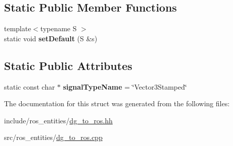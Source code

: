 \subsection*{Static Public Member Functions}
\begin{DoxyCompactItemize}
\item 
{\footnotesize template$<$typename S $>$ }\\static void {\bfseries set\+Default} (S \&s)\hypertarget{structdynamic__graph_1_1DgToRos_3_01std_1_1pair_3_01specific_1_1Vector3_00_01Vector_01_4_01_4_a85e4b5b1a35534adb8584c723bf93a7c}{}\label{structdynamic__graph_1_1DgToRos_3_01std_1_1pair_3_01specific_1_1Vector3_00_01Vector_01_4_01_4_a85e4b5b1a35534adb8584c723bf93a7c}

\end{DoxyCompactItemize}
\subsection*{Static Public Attributes}
\begin{DoxyCompactItemize}
\item 
static const char $\ast$ {\bfseries signal\+Type\+Name} = \char`\"{}Vector3\+Stamped\char`\"{}\hypertarget{structdynamic__graph_1_1DgToRos_3_01std_1_1pair_3_01specific_1_1Vector3_00_01Vector_01_4_01_4_a39142c1dac9d7e9aab9230dce9a6fd79}{}\label{structdynamic__graph_1_1DgToRos_3_01std_1_1pair_3_01specific_1_1Vector3_00_01Vector_01_4_01_4_a39142c1dac9d7e9aab9230dce9a6fd79}

\end{DoxyCompactItemize}


The documentation for this struct was generated from the following files\+:\begin{DoxyCompactItemize}
\item 
include/ros\+\_\+entities/\hyperlink{dg__to__ros_8hh}{dg\+\_\+to\+\_\+ros.\+hh}\item 
src/ros\+\_\+entities/\hyperlink{dg__to__ros_8cpp}{dg\+\_\+to\+\_\+ros.\+cpp}\end{DoxyCompactItemize}
